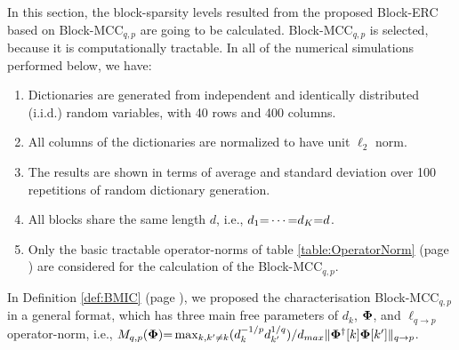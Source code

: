 In this section, the block-sparsity levels resulted from the proposed Block-ERC based on Block-MCC$_{q,p}$  are going to be calculated.
Block-MCC$_{q,p}$ is selected, because it is computationally tractable. 
In all of the numerical simulations performed below, we have:
\begin{enumerate}
\item Dictionaries are generated from independent and identically distributed (i.i.d.) random variables, with 40 rows and 400 columns.
\item All columns of the dictionaries are normalized to have unit $\ell_2$ norm.
\item The results are shown in terms of average and standard deviation over 100 repetitions of random dictionary generation.
\item All blocks share the same length $d$, i.e., $d_1 {=} \cdots {=} d_K {=} d$.
\item Only the basic tractable operator-norms of table \ref{table:OperatorNorm} (page \pageref{table:OperatorNorm}) are considered for the calculation of the Block-MCC$_{q,p}$.
\end{enumerate}
In Definition \ref{def:BMIC} (page \pageref{def:BMIC}), we proposed the characterisation Block-MCC$_{q,p}$ in a general format, which has three main free parameters of $d_k$, $\boldsymbol{\Phi}$, and  $\ell_{q {\to} p}$ operator-norm, i.e., $M_{q,p}(\boldsymbol{\Phi}) {=} \max_{k,k' \neq k} (d_{k}^{-1/p} d_{k'}^{1/q}) / d_{max} \Vert \boldsymbol{\Phi}^\dagger [k] \boldsymbol{\Phi} [k'] \Vert_{q \to p}$.
